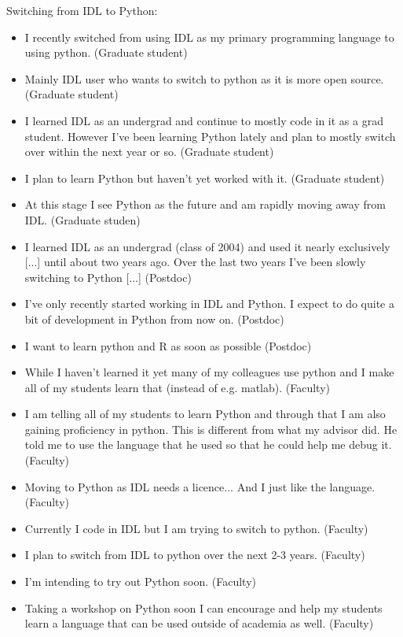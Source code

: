 \begin{appendix}

Switching from IDL to Python:

\begin{itemize}
\item{I recently switched from using IDL as my primary programming language to using python. (Graduate student)}
\item{Mainly IDL user who wants to switch to python as it is more open source. (Graduate student)}
\item{I learned IDL as an undergrad and continue to mostly code in it as a grad student. However I've been learning Python lately and plan to mostly switch over within the next year or so. (Graduate student)}
\item{I plan to learn Python but haven't yet worked with it. (Graduate student)}
\item{At this stage I see Python as the future and am rapidly moving away from IDL. (Graduate studen)}
\item{I learned IDL as an undergrad (class of 2004) and used it nearly exclusively [...] until about two years ago. Over the last two years I've been slowly switching to Python [...]
(Postdoc)}
\item{I've only recently started working in IDL and Python.  I expect to do quite a bit of development in Python from now on. (Postdoc)}
\item{I want to learn python and R as soon as possible (Postdoc)}
\item{While I haven't learned it yet many of my colleagues use python and I make all of my students learn that (instead of e.g. matlab). (Faculty)}
\item{I am telling all of my students to learn Python and through that I am also gaining proficiency in python.  This is different from what my advisor did.  He told me to use the language that he used so that he could help me debug it. (Faculty)}
\item{Moving to Python as IDL needs a licence... And I just like the language. (Faculty)}
\item{Currently I code in IDL but I am trying to switch to python. (Faculty)}
\item{I plan to switch from IDL to python over the next 2-3 years. (Faculty)}
\item{I'm intending to try out Python soon. (Faculty)}
\item{Taking a workshop on Python soon I can encourage and help my students learn a language that can be used outside of academia as well. (Faculty)}
\end{itemize}


\end{appendix}
